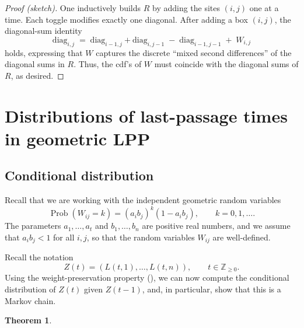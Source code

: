 \documentclass[letterpaper,11pt,oneside,reqno]{article}
\numberwithin{equation}{section}
\newtheorem{theorem}[proposition]{Theorem}
\theoremstyle{definition}
\begin{document}
\begin{proof}[Proof (sketch)]
	One inductively builds $R$ by adding the sites $(i,j)$ one at a time.  Each toggle modifies exactly one diagonal.
	After adding a box $(i,j)$, the diagonal-sum identity
\[
\mathrm{diag}_{i,j}
\;=\;
\mathrm{diag}_{i-1,j} + \mathrm{diag}_{i,j-1}
\;-\;
\mathrm{diag}_{i-1,j-1}
\;+\;
W_{i,j}
\]
holds, expressing that $W$ captures the discrete ``mixed second differences'' of the diagonal sums in $R$.
Thus, the cdf's of $W$ must coincide with the diagonal sums of $R$, as desired.
\end{proof}

\section{Distributions of last-passage times in geometric LPP}
\label{sec:distributions_geometric_LPP}

\subsection{Conditional distribution}

Recall that we are working with the independent geometric random variables
\begin{equation*}
	\operatorname{Prob}\left( W_{ij}=k \right)=(a_ib_j)^k(1-a_ib_j),\qquad k=0,1,\ldots.
\end{equation*}
The parameters $a_1,\ldots,a_t $ and $b_1,\ldots,b_n$ are positive real numbers, and we assume that $a_i b_j<1$ for all $i,j$,
so that the random variables $W_{ij}$ are well-defined.

Recall the notation
\begin{equation*}
	Z(t)=\left( L(t,1),\ldots,L(t,n)  \right),\qquad t\in\mathbb{Z}_{\ge0}.
\end{equation*}
Using the weight-preservation property (), we can now 
compute the conditional distribution of 
$Z(t)$ given $Z(t-1)$, and, in particular, show that this is a Markov chain.

\begin{theorem}
	\label{thm:conditional_distribution_Z}
\end{theorem}
\end{document}
